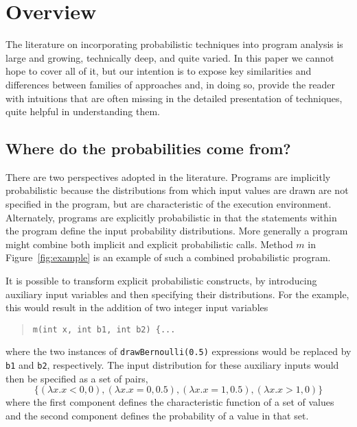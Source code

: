 \section{Overview}
\label{sec:overview}

The literature on incorporating probabilistic techniques into 
program analysis is large and growing, technically deep, and quite
varied.  In this paper we cannot hope to cover all of it, but our
intention is to expose key similarities and differences between 
families of approaches and, in doing so, provide the reader with
intuitions that are often missing in the detailed presentation of
techniques, quite helpful in understanding them.

\subsection{Where do the probabilities come from?}
There are two perspectives adopted in the literature.
Programs are implicitly probabilistic because the distributions
from which input values are drawn are not specified in the program,
but are characteristic of the execution environment.
Alternately, programs are explicitly probabilistic in that the statements
within the program define the input probability distributions.
More generally a program might combine both implicit and explicit
probabilistic calls.  Method $m$ in Figure~\ref{fig:example}
is an example of such a combined probabilistic program.

It is possible to transform explicit probabilistic constructs,
by introducing auxiliary input variables and then specifying
their distributions.   For the example, this would result
in the addition of two integer input variables 
\begin{quote}
\texttt{m(int x, int b1, int b2) \{...} 
\end{quote}
where the two instances of
\texttt{drawBernoulli(0.5)} expressions would be replaced
by \texttt{b1} and \texttt{b2}, respectively.  The input
distribution for these auxiliary inputs would then be specified
as a set of pairs,
\[
\{ (\lambda x.x<0,0), (\lambda x.x=0,0.5), (\lambda x.x=1,0.5), (\lambda x.x>1,0) \}
\]
where the first component defines the characteristic function
of a set of values and the second component defines the probability
of a value in that set.

